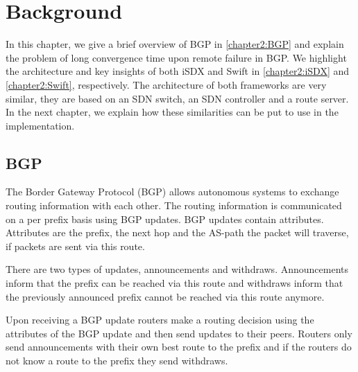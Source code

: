 
\chapter{\label{chapter2}Background}

In this chapter, we give a brief overview of BGP in \ref{chapter2:BGP} and explain the problem of long convergence time upon remote failure in BGP. We highlight the architecture and key insights of both iSDX and Swift in \ref{chapter2:iSDX} and \ref{chapter2:Swift}, respectively. The architecture of both frameworks are very similar, they are based on an SDN switch, an SDN controller and a route server. In the next chapter, we explain how these similarities can be put to use in the implementation.

\section{\label{chapter2:BGP}BGP}

The Border Gateway Protocol (BGP) allows autonomous systems to exchange routing information with each other. The routing information is communicated on a per prefix basis using BGP updates. BGP updates contain attributes. Attributes are the prefix, the next hop and the AS-path the packet will traverse, if packets are sent via this route. 

There are two types of updates, announcements and withdraws. Announcements inform that the prefix can be reached via this route and withdraws inform that the previously announced prefix cannot be reached via this route anymore. 

Upon receiving a BGP update routers make a routing decision using the attributes of the BGP update and then send updates to their peers. Routers only send announcements with their own best route to the prefix and if the routers do not know a route to the prefix they send withdraws.


